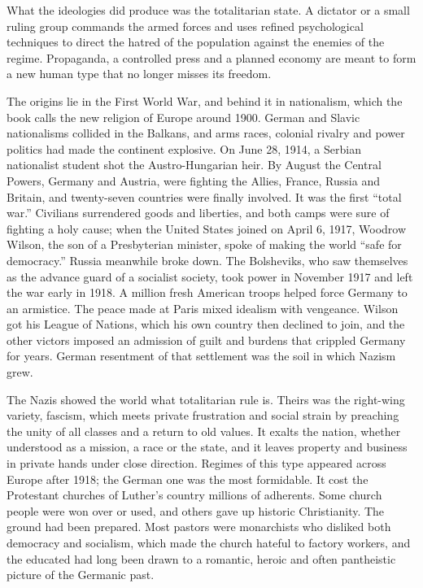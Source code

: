 What the ideologies did produce was the totalitarian state. A dictator or a small ruling group
commands the armed forces and uses refined psychological techniques to direct the hatred of the
population against the enemies of the regime. Propaganda, a controlled press and a planned economy
are meant to form a new human type that no longer misses its freedom.

The origins lie in the First World War, and behind it in nationalism, which the book calls the new
religion of Europe around 1900. German and Slavic nationalisms collided in the Balkans, and arms
races, colonial rivalry and power politics had made the continent explosive. On June 28, 1914, a
Serbian nationalist student shot the Austro-Hungarian heir. By August the Central Powers, Germany and
Austria, were fighting the Allies, France, Russia and Britain, and twenty-seven countries were
finally involved. It was the first ``total war.'' Civilians surrendered goods and liberties, and both
camps were sure of fighting a holy cause; when the United States joined on April 6, 1917, Woodrow
Wilson, the son of a Presbyterian minister, spoke of making the world ``safe for democracy.'' Russia
meanwhile broke down. The Bolsheviks, who saw themselves as the advance guard of a socialist society,
took power in November 1917 and left the war early in 1918. A million fresh American troops helped
force Germany to an armistice. The peace made at Paris mixed idealism with vengeance. Wilson got his
League of Nations, which his own country then declined to join, and the other victors imposed an
admission of guilt and burdens that crippled Germany for years. German resentment of that settlement
was the soil in which Nazism grew.

The Nazis showed the world what totalitarian rule is. Theirs was the right-wing variety, fascism,
which meets private frustration and social strain by preaching the unity of all classes and a return
to old values. It exalts the nation, whether understood as a mission, a race or the state, and it
leaves property and business in private hands under close direction. Regimes of this type appeared
across Europe after 1918; the German one was the most formidable. It cost the Protestant churches of
Luther's country millions of adherents. Some church people were won over or used, and others gave up
historic Christianity. The ground had been prepared. Most pastors were monarchists who disliked both
democracy and socialism, which made the church hateful to factory workers, and the educated had long
been drawn to a romantic, heroic and often pantheistic picture of the Germanic past.

